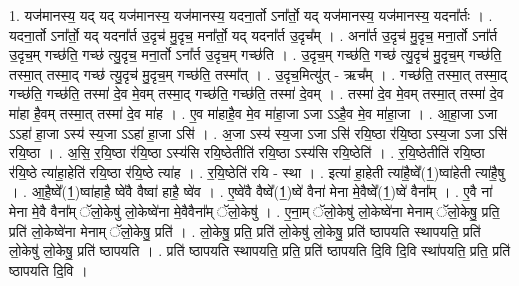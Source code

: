 \documentclass[17pt]{extarticle}
\begin{document}
1. यज॑मानस्य॒ यद् यद् यज॑मानस्य॒ यज॑मानस्य॒ यदना॒र्तो ऽना᳚र्तो॒ यद् यज॑मानस्य॒ यज॑मानस्य॒ यदना᳚र्तः । . यदना॒र्तो ऽना᳚र्तो॒ यद् यदना᳚र्त उ॒दृच॑ मु॒दृच॒ मना᳚र्तो॒ यद् यदना᳚र्त उ॒दृच᳚म् । . अना᳚र्त उ॒दृच॑ मु॒दृच॒ मना॒र्तो ऽना᳚र्त उ॒दृच॒म् गच्छ॑ति॒ गच्छ॑ त्यु॒दृच॒ मना॒र्तो ऽना᳚र्त उ॒दृच॒म् गच्छ॑ति । . उ॒दृच॒म् गच्छ॑ति॒ गच्छ॑ त्यु॒दृच॑ मु॒दृच॒म् गच्छ॑ति॒ तस्मा॒त् तस्मा॒द् गच्छ॑ त्यु॒दृच॑ मु॒दृच॒म् गच्छ॑ति॒ तस्मा᳚त् । . उ॒दृच॒मित्यु॑त् - ऋच᳚म् । . गच्छ॑ति॒ तस्मा॒त् तस्मा॒द् गच्छ॑ति॒ गच्छ॑ति॒ तस्मा॑ दे॒व मे॒वम् तस्मा॒द् गच्छ॑ति॒ गच्छ॑ति॒ तस्मा॑ दे॒वम् । . तस्मा॑ दे॒व मे॒वम् तस्मा॒त् तस्मा॑ दे॒व मा॑हा है॒वम् तस्मा॒त् तस्मा॑ दे॒व मा॑ह । . ए॒व मा॑हाहै॒व मे॒व मा॑हा॒जा ऽजा ऽऽहै॒व मे॒व मा॑हा॒जा । . आ॒हा॒जा ऽजा ऽऽहा॑ हा॒जा ऽस्य॑ स्य॒जा ऽऽहा॑ हा॒जा ऽसि॑ । . अ॒जा ऽस्य॑ स्य॒जा ऽजा ऽसि॑ रयि॒ष्ठा र॑यि॒ष्ठा ऽस्य॒जा ऽजा ऽसि॑ रयि॒ष्ठा । . अ॒सि॒ र॒यि॒ष्ठा र॑यि॒ष्ठा ऽस्य॑सि रयि॒ष्ठेतीति॑ रयि॒ष्ठा ऽस्य॑सि रयि॒ष्ठेति॑ । . र॒यि॒ष्ठेतीति॑ रयि॒ष्ठा र॑यि॒ष्ठे त्या॑हा॒हेति॑ रयि॒ष्ठा र॑यि॒ष्ठे त्या॑ह । . र॒यि॒ष्ठेति॑ रयि - स्था । . इत्या॑ हा॒हेती त्या॑है॒ष्वे᳚(1॒)ष्वा॑हेती त्या॑है॒षु । . आ॒है॒ष्वे᳚(1॒)ष्वा॑हाहै॒ ष्वे॑वै वैष्वा॑ हाहै॒ ष्वे॑व । . ए॒ष्वे॑वै वैष्वे᳚(1॒)ष्वे॑ वैना॑ मेना मे॒वैष्वे᳚(1॒)ष्वे॑ वैना᳚म् । . ए॒वै ना॑ मेना मे॒वै वैना᳚म् ॅलो॒केषु॑ लो॒केष्वे॑ना मे॒वैवैना᳚म् ॅलो॒केषु॑ । . ए॒ना॒म् ॅलो॒केषु॑ लो॒केष्वे॑ना मेनाम् ॅलो॒केषु॒ प्रति॒ प्रति॑ लो॒केष्वे॑ना मेनाम् ॅलो॒केषु॒ प्रति॑ । . लो॒केषु॒ प्रति॒ प्रति॑ लो॒केषु॑ लो॒केषु॒ प्रति॑ ष्ठापयति स्थापयति॒ प्रति॑ लो॒केषु॑ लो॒केषु॒ प्रति॑ ष्ठापयति । . प्रति॑ ष्ठापयति स्थापयति॒ प्रति॒ प्रति॑ ष्ठापयति दि॒वि दि॒वि स्था॑पयति॒ प्रति॒ प्रति॑ ष्ठापयति दि॒वि । \newline
\end{document}
